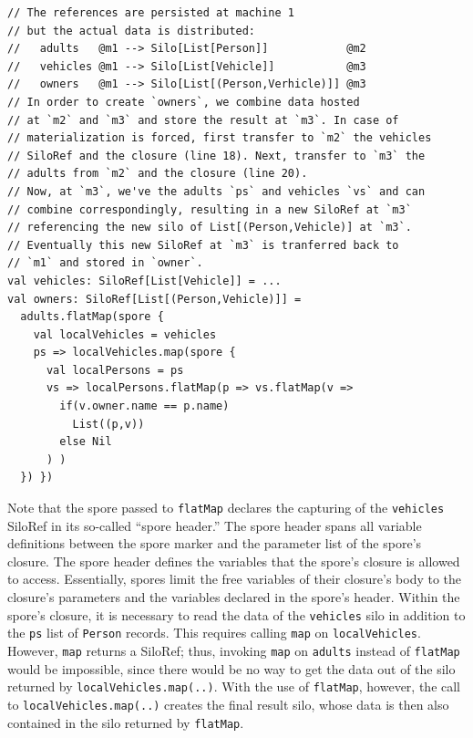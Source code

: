 \documentclass[preprint]{sigplanconf}
\theoremstyle{definition}
\theoremstyle{definition}
\begin{document}
\begin{lstlisting}[numbers=right,numbersep=5pt,stepnumber=2]
// The references are persisted at machine 1
// but the actual data is distributed:
//   adults   @m1 --> Silo[List[Person]]            @m2
//   vehicles @m1 --> Silo[List[Vehicle]]           @m3
//   owners   @m1 --> Silo[List[(Person,Verhicle)]] @m3
// In order to create `owners`, we combine data hosted
// at `m2` and `m3` and store the result at `m3`. In case of
// materialization is forced, first transfer to `m2` the vehicles
// SiloRef and the closure (line 18). Next, transfer to `m3` the
// adults from `m2` and the closure (line 20).
// Now, at `m3`, we've the adults `ps` and vehicles `vs` and can
// combine correspondingly, resulting in a new SiloRef at `m3`
// referencing the new silo of List[(Person,Vehicle)] at `m3`.
// Eventually this new SiloRef at `m3` is tranferred back to
// `m1` and stored in `owner`.
val vehicles: SiloRef[List[Vehicle]] = ...
val owners: SiloRef[List[(Person,Vehicle)]] =
  adults.flatMap(spore {
    val localVehicles = vehicles
    ps => localVehicles.map(spore {
      val localPersons = ps
      vs => localPersons.flatMap(p => vs.flatMap(v =>
        if(v.owner.name == p.name)
          List((p,v))
        else Nil
      ) )
  }) })
\end{lstlisting}
\noindent
Note that the spore passed to \verb|flatMap| declares the capturing of the 
\verb|vehicles| SiloRef in its so-called ``spore header.''  The spore header spans all variable definitions between the spore 
marker and the parameter list of the spore's closure. The spore header defines 
the variables that the spore's closure is allowed to access. Essentially, spores 
limit the free variables of their closure's body to the closure's parameters and 
the variables declared in the spore's header.  Within the spore's closure, it is necessary to read the data 
of the \verb|vehicles| silo in addition to the \verb|ps| list of \verb|Person| 
records. This requires calling \verb|map| on \verb|localVehicles|. However, 
\verb|map| returns a SiloRef; thus, invoking \verb|map| on \verb|adults| instead 
of \verb|flatMap| would be impossible, since there would be no way to get the 
data out of the silo returned by \verb|localVehicles.map(..)|. With the use of 
\verb|flatMap|, however, the call to \verb|localVehicles.map(..)| creates the 
final result silo, whose data is then also contained in the silo returned by 
\verb|flatMap|.
\end{document}
